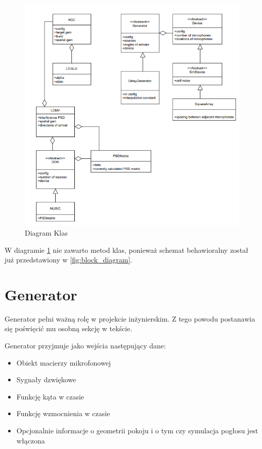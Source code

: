 \begin{figure}[h!]
    \centering
    \includegraphics[width=\textwidth]{Images/uml.png}
    \caption{Diagram Klas}
    \label{fig:classes}
\end{figure}


\noindent W diagramie \ref{fig:classes} nie zawarto metod klas, ponieważ schemat behawioralny został już przedstawiony w \ref{fig:block_diagram}.


\newpage

\section{Generator}

Generator pełni ważną rolę w projekcie inżynierskim. Z tego powodu postanawia się poświęcić mu osobną sekcję w tekście. 

\noindent Generator przyjmuje jako wejścia następujący dane:

\begin{itemize}
    \item Obiekt macierzy mikrofonowej
    \item Sygnały dzwiękowe 
    \item Funkcję kąta w czasie
    \item Funkcję wzmocnienia w czasie
    \item Opcjonalnie informacje o geometrii pokoju i o tym czy symulacja pogłosu jest włączona
\end{itemize}

